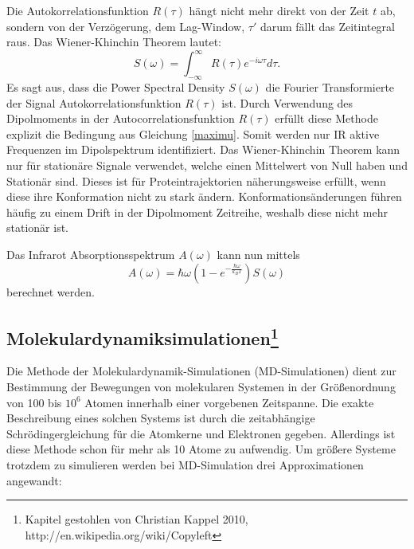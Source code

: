 \documentclass[a4paper,12pt]{article}
\begin{document}
Die Autokorrelationsfunktion $R(\tau)$ hängt nicht mehr direkt von der Zeit $t$ ab, sondern von der Verzögerung, dem Lag-Window, $\tau'$ darum fällt das Zeitintegral raus.
Das Wiener-Khinchin Theorem lautet:
  \begin{equation}\label{WKT}
    S(\omega)          =\int_{-\infty}^{\infty} R(\tau) e^{-i\omega\tau} d\tau. 
  \end{equation}
Es sagt aus, dass die Power Spectral Density $S(\omega)$ die Fourier Transformierte der Signal Autokorrelationsfunktion $R(\tau)$ ist.
Durch Verwendung des Dipolmoments in der Autocorrelationsfunktion $R(\tau)$ erfüllt diese Methode explizit die Bedingung aus Gleichung \ref{maximu}. Somit werden nur IR aktive Frequenzen im
Dipolspektrum identifiziert. Das Wiener-Khinchin Theorem kann nur für stationäre Signale verwendet, welche einen Mittelwert von Null haben und Stationär sind. Dieses ist für Proteintrajektorien 
näherungsweise erfüllt, wenn diese ihre Konformation nicht zu stark ändern. Konformationsänderungen führen häufig zu einem Drift in der Dipolmoment Zeitreihe, weshalb diese nicht mehr stationär ist.

Das Infrarot Absorptionsspektrum $A(\omega)$ kann nun mittels 
\begin{equation}
 A(\omega)= \hbar\omega \left( 1-e^{-\frac{\hbar \omega}{k_B T}} \right) S(\omega)
\end{equation}
berechnet werden.



\subsection*{Molekulardynamiksimulationen\footnote{Kapitel gestohlen von Christian Kappel 2010, http://en.wikipedia.org/wiki/Copyleft}}

Die Methode der Molekulardynamik-Simulationen (MD-Simulationen) dient zur
Bestimmung der Bewegungen von molekularen Systemen in der Gr\"o\ss enordnung von
100 bis $10^6$ Atomen innerhalb einer vorgebenen Zeitspanne.
Die exakte Beschreibung eines solchen Systems ist durch die zeitabh\"angige
Schr\"odingergleichung f\"ur die Atomkerne und Elektronen gegeben. Allerdings ist
diese Methode schon f\"ur mehr als 10 Atome zu aufwendig. Um gr\"o\ss ere Systeme
trotzdem zu simulieren werden bei MD-Simulation drei Approximationen angewandt:
\end{document}
